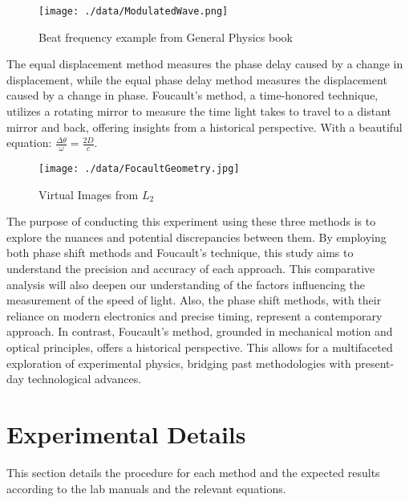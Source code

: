 \documentclass[12pt]{article}
\begin{document}
	\begin{figure}[!h]
		\centering
		\caption{Beat frequency example from General Physics book}
		\label{ModulatedWave}
		\texttt{[image: ./data/ModulatedWave.png]}
	\end{figure}
	
	The equal displacement method measures the phase delay caused by a change in displacement, while the equal phase delay method measures the displacement caused by a change in phase. Foucault's method, a time-honored technique, utilizes a rotating mirror to measure the time light takes to travel to a distant mirror and back, offering insights from a historical perspective. With a beautiful equation: $ \frac{\Delta \theta}{\omega} = \frac{2D}{c} $.
	
	\begin{figure}[!h]
		\centering
		\caption{Virtual Images from $L_2$}
		\label{FocaultGeometry}
		\texttt{[image: ./data/FocaultGeometry.jpg]}
	\end{figure}
	
	The purpose of conducting this experiment using these three methods is to explore the nuances and potential discrepancies between them. By employing both phase shift methods and Foucault's technique, this study aims to understand the precision and accuracy of each approach. This comparative analysis will also deepen our understanding of the factors influencing the measurement of the speed of light. Also, the phase shift methods, with their reliance on modern electronics and precise timing, represent a contemporary approach. In contrast, Foucault's method, grounded in mechanical motion and optical principles, offers a historical perspective. This allows for a multifaceted exploration of experimental physics, bridging past methodologies with present-day technological advances.
	

\clearpage

	\section{Experimental Details}
	
	This section details the procedure for each method and the expected results according to the lab manuals and the relevant equations.
	
\end{document}
